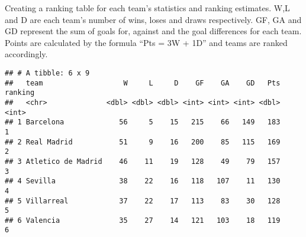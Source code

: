 \documentclass[
]{article}
\newenvironment{Shaded}{\begin{snugshade}}{\end{snugshade}}
\newcommand{\AttributeTok}[1]{\textcolor[rgb]{0.77,0.63,0.00}{#1}}
\newcommand{\DecValTok}[1]{\textcolor[rgb]{0.00,0.00,0.81}{#1}}
\newcommand{\FunctionTok}[1]{\textcolor[rgb]{0.00,0.00,0.00}{#1}}
\newcommand{\NormalTok}[1]{#1}
\newcommand{\OtherTok}[1]{\textcolor[rgb]{0.56,0.35,0.01}{#1}}
\newcommand{\SpecialCharTok}[1]{\textcolor[rgb]{0.00,0.00,0.00}{#1}}
\begin{document}
Creating a ranking table for each team's statistics and ranking
estimates. W,L and D are each team's number of wins, loses and draws
respectively. GF, GA and GD represent the sum of goals for, against and
the goal differences for each team. Points are calculated by the formula
``Pts = 3W + 1D'' and teams are ranked accordingly.

\begin{Shaded}
\end{Shaded}

\begin{verbatim}
## # A tibble: 6 x 9
##   team                   W     L     D    GF    GA    GD   Pts ranking
##   <chr>              <dbl> <dbl> <dbl> <int> <int> <int> <dbl>   <int>
## 1 Barcelona             56     5    15   215    66   149   183       1
## 2 Real Madrid           51     9    16   200    85   115   169       2
## 3 Atletico de Madrid    46    11    19   128    49    79   157       3
## 4 Sevilla               38    22    16   118   107    11   130       4
## 5 Villarreal            37    22    17   113    83    30   128       5
## 6 Valencia              35    27    14   121   103    18   119       6
\end{verbatim}
\end{document}
